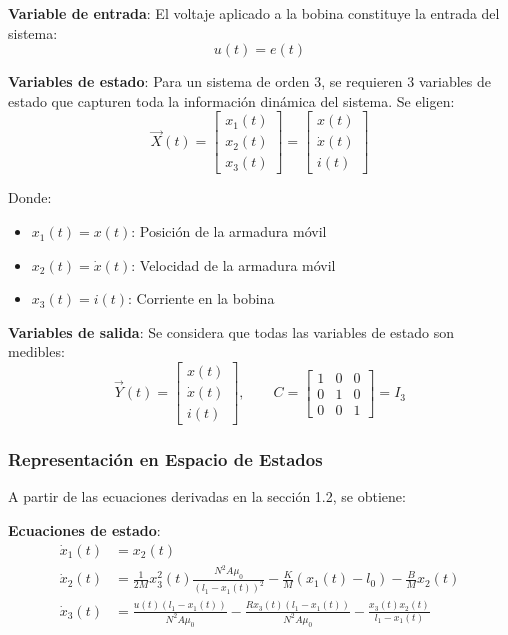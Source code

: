 \documentclass[
  11pt,
  letterpaper,
   addpoints,
   answers
  ]{exam}
\begin{document}
\begin{solution}
\textbf{Variable de entrada}: El voltaje aplicado a la bobina constituye la entrada del sistema:
\[
u(t) = e(t)
\]

\textbf{Variables de estado}: Para un sistema de orden 3, se requieren 3 variables de estado que capturen toda la información dinámica del sistema. Se eligen:
\[
\vec{X}(t) = \begin{bmatrix}
x_1(t) \\ x_2(t) \\ x_3(t)
\end{bmatrix} = \begin{bmatrix}
x(t) \\ \dot{x}(t) \\ i(t)
\end{bmatrix}
\]

Donde:
\begin{itemize}
    \item $x_1(t) = x(t)$: Posición de la armadura móvil
    \item $x_2(t) = \dot{x}(t)$: Velocidad de la armadura móvil  
    \item $x_3(t) = i(t)$: Corriente en la bobina
\end{itemize}

\textbf{Variables de salida}: Se considera que todas las variables de estado son medibles:
\[
\vec{Y}(t) = \begin{bmatrix}
x(t) \\ \dot{x}(t) \\ i(t)
\end{bmatrix}, \qquad
C = \begin{bmatrix}
1 & 0 & 0 \\
0 & 1 & 0 \\
0 & 0 & 1
\end{bmatrix} = I_3
\]

\subsubsection*{Representación en Espacio de Estados}

A partir de las ecuaciones derivadas en la sección 1.2, se obtiene:

\textbf{Ecuaciones de estado}:
\begin{align}
\dot{x}_1(t) &= x_2(t) \\
\dot{x}_2(t) &= \frac{1}{2M} x_3^2(t) \frac{N^2 A \mu_0}{(l_1 - x_1(t))^2} - \frac{K}{M}(x_1(t) - l_0) - \frac{B}{M} x_2(t) \\
\dot{x}_3(t) &= \frac{u(t)(l_1 - x_1(t))}{N^2 A \mu_0} - \frac{R x_3(t)(l_1 - x_1(t))}{N^2 A \mu_0} - \frac{x_3(t) x_2(t)}{l_1 - x_1(t)}
\end{align}


\end{solution}
\end{document}

